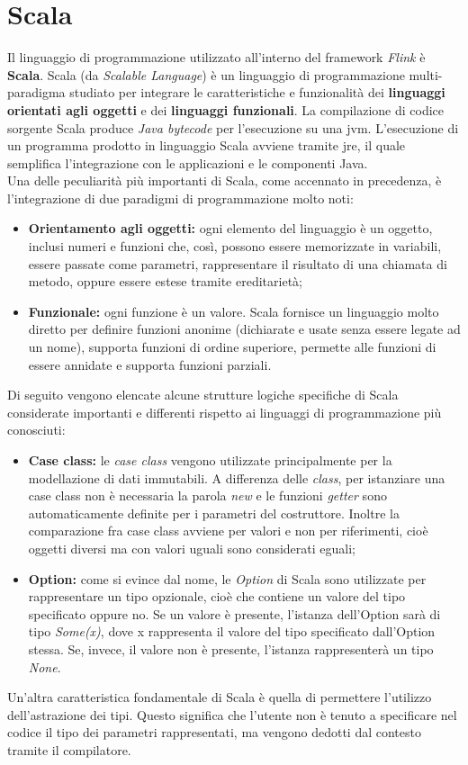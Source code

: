 \section{Scala}\label{sec:scala}
Il linguaggio di programmazione utilizzato all'interno del \gls{framework} \textit{Flink} è \textbf{Scala}. Scala (da \textit{Scalable Language}) è un linguaggio di programmazione multi-paradigma studiato per integrare le caratteristiche e funzionalità dei \textbf{linguaggi orientati agli oggetti} e dei \textbf{linguaggi funzionali}. La compilazione di codice sorgente Scala produce \textit{Java bytecode} per l'esecuzione su una \gls{jvm}. L'esecuzione di un programma prodotto in linguaggio Scala avviene tramite \gls{jre}, il quale semplifica l'integrazione con le applicazioni e le componenti Java.\\
Una delle peculiarità più importanti di Scala, come accennato in precedenza, è l'integrazione di due paradigmi di programmazione molto noti:
\begin{itemize}
	\item{\textbf{Orientamento agli oggetti:} ogni elemento del linguaggio è un oggetto, inclusi numeri e funzioni che, così, possono essere memorizzate in variabili, essere passate come parametri, rappresentare il risultato di una chiamata di metodo, oppure essere estese tramite ereditarietà;}
	\item{\textbf{Funzionale:} ogni funzione è un valore. Scala fornisce un linguaggio molto diretto per definire funzioni anonime (dichiarate e usate senza essere legate ad un nome), supporta funzioni di ordine superiore, permette alle funzioni di essere annidate e supporta funzioni parziali.}
\end{itemize}
Di seguito vengono elencate alcune strutture logiche specifiche di Scala considerate importanti e differenti rispetto ai linguaggi di programmazione più conosciuti:
\begin{itemize}
	\item{\textbf{Case class:} le \textit{case class} vengono utilizzate principalmente per la modellazione di dati immutabili. A differenza delle \textit{class}, per istanziare una case class non è necessaria la parola \textit{new} e le funzioni \textit{getter} sono automaticamente definite per i parametri del costruttore. Inoltre la comparazione fra case class avviene per valori e non per riferimenti, cioè oggetti diversi ma con valori uguali sono considerati eguali;}
	\item{\textbf{Option:} come si evince dal nome, le \textit{Option} di Scala sono utilizzate per rappresentare un tipo opzionale, cioè che contiene un valore del tipo specificato oppure no. Se un valore è presente, l'istanza dell'Option sarà di tipo \textit{Some(x)}, dove x rappresenta il valore del tipo specificato dall'Option stessa. Se, invece, il valore non è presente, l'istanza rappresenterà un tipo \textit{None}.}
\end{itemize}
Un'altra caratteristica fondamentale di Scala è quella di permettere l'utilizzo dell'astrazione dei tipi. Questo significa che l'utente non è tenuto a specificare nel codice il tipo dei parametri rappresentati, ma vengono dedotti dal contesto tramite il compilatore.

